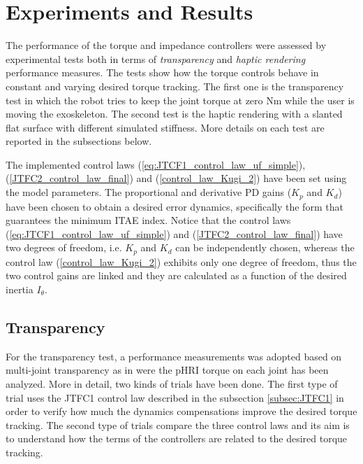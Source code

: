 \section{Experiments and Results} \label{sec:experimentsResults}

The performance of the torque and impedance controllers were assessed by experimental tests  both in terms of {\em transparency} and {\em haptic rendering} performance measures. 
The tests show how the torque controls behave in constant and varying desired torque tracking.
The first one is the transparency test in which the robot tries to keep the joint torque at zero Nm while the user is moving the exoskeleton.
The second test is the haptic rendering with a slanted flat surface with different simulated stiffness.
More details on each test are reported in the subsections below.
\par The implemented control laws (\ref{eq:JTCF1_control_law_uf_simple}), (\ref{JTFC2_control_law_final}) and (\ref{control_law_Kugi_2}) have been set using the model parameters. The proportional and derivative PD gains ($K_p$ and $K_d$) have been chosen to obtain a desired error dynamics, specifically the form that guarantees the minimum ITAE index. Notice that the control laws (\ref{eq:JTCF1_control_law_uf_simple}) and (\ref{JTFC2_control_law_final}) have two degrees of freedom, i.e. $K_p$ and $K_d$ can be independently chosen, whereas the control law (\ref{control_law_Kugi_2}) exhibits only one degree of freedom, thus the two control gains are linked and they are calculated as a function of the desired inertia $I_{\theta}$.

\subsection{Transparency} \label{subsec:transparency}

For the transparency test, 
a performance measurements was adopted based on multi-joint transparency as in \cite{just2018exoskeleton} were the pHRI torque on each joint has been analyzed.
More in detail, two kinds of trials have been done.
The first type of trial uses the JTFC1 control law described in the subsection \ref{subsec:JTFC1} in order to verify how much the dynamics compensations improve the desired torque tracking.
The second type of trials compare the three control laws and its aim is to understand how the terms of the controllers are related to the desired torque tracking.

